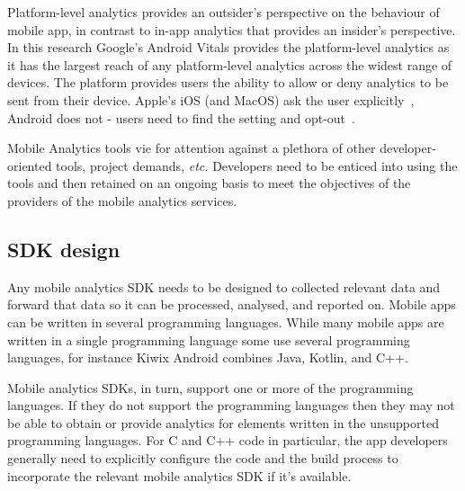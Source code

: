 Platform-level analytics provides an outsider's perspective on the behaviour of mobile app, in contrast to in-app analytics that provides an insider's perspective. In this research Google's Android Vitals provides the platform-level analytics as it has the largest reach of any platform-level analytics across the widest range of devices. The platform provides users the ability to allow or deny analytics to be sent from their device. Apple's iOS (and MacOS) ask the user explicitly~\citep{apple_ios_share_diagnostics}, Android does not - users need to find the setting and opt-out~\citep{google_play_share_usage_and_diagnostics_info_with_google}. %

Mobile Analytics tools vie for attention against a plethora of other developer-oriented tools, project demands, \emph{etc.} Developers need to be enticed into using the tools and then retained on an ongoing basis to meet the objectives of the providers of the mobile analytics services.

\subsection{SDK design}
Any mobile analytics SDK needs to be designed to collected relevant data and forward that data so it can be processed, analysed, and reported on. Mobile apps %
can be written in several programming languages. While many mobile apps are written in a single programming language some use several programming languages, for instance Kiwix Android combines Java, Kotlin, and C++. 

Mobile analytics SDKs, in turn, support one or more of the programming languages. If they do not support the programming languages then they may not be able to obtain or provide analytics for elements written in the unsupported programming languages. For C and C++ code in particular, the app developers generally need to explicitly configure the code and the build process to incorporate the relevant mobile analytics SDK if it's available. %

